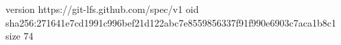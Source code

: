 version https://git-lfs.github.com/spec/v1
oid sha256:271641e7cd1991c996bef21d122abc7e8559856337f91f990e6903c7aca1b8c1
size 74
